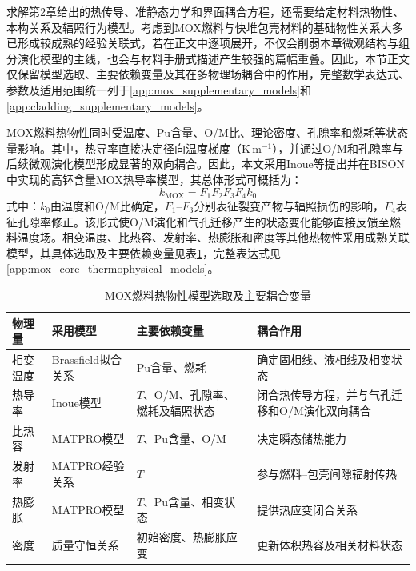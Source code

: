 求解第2章给出的热传导、准静态力学和界面耦合方程，还需要给定材料热物性、本构关系及辐照行为模型。考虑到MOX燃料与快堆包壳材料的基础物性关系大多已形成较成熟的经验关联式，若在正文中逐项展开，不仅会削弱本章微观结构与组分演化模型的主线，也会与材料手册式描述产生较强的篇幅重叠。因此，本节正文仅保留模型选取、主要依赖变量及其在多物理场耦合中的作用，完整数学表达式、参数及适用范围统一列于\ref{app:mox_supplementary_models}和\ref{app:cladding_supplementary_models}。

\label{sec:mox_thermophysical_properties}

MOX燃料热物性同时受温度、Pu含量、O/M比、理论密度、孔隙率和燃耗等状态量影响。其中，热导率直接决定径向温度梯度（$\mathrm{K\,m^{-1}}$），并通过O/M和孔隙率与后续微观演化模型形成显著的双向耦合。因此，本文采用Inoue等提出并在BISON中实现的高钚含量MOX热导率模型\cite{inoueThermalConductivityUranium2000,halesBISONTheoryManual2016}，其总体形式可概括为：
\begin{equation}
	k_{\mathrm{MOX}}
	=F_1F_2F_3F_4k_0
	\label{eq:ch3_mox_thermal_conductivity_coupling}
\end{equation}
\noindent 式中：$k_0$由温度和O/M比确定，$F_1$--$F_3$分别表征裂变产物与辐照损伤的影响，$F_4$表征孔隙率修正。该形式使O/M演化和气孔迁移产生的状态变化能够直接反馈至燃料温度场。相变温度、比热容、发射率、热膨胀和密度等其他热物性采用成熟关联模型，其具体选取及主要依赖变量见表\ref{tab:ch3_mox_thermophysical_selection}，完整表达式见\ref{app:mox_core_thermophysical_models}。

\begin{table}[htbp]
	\centering
	\caption{MOX燃料热物性模型选取及主要耦合变量}
	\label{tab:ch3_mox_thermophysical_selection}
	\begin{tabularx}{\textwidth}{@{}
			>{\centering\arraybackslash}m{2.4cm}
			>{\centering\arraybackslash}m{3.2cm}
			>{\centering\arraybackslash}X
			>{\centering\arraybackslash}X
			@{}}
		\toprule
		物理量 & 采用模型 & 主要依赖变量 & 耦合作用 \\
		\midrule
		相变温度 & Brassfield拟合关系 & Pu含量、燃耗 & 确定固相线、液相线及相变状态 \\
		热导率 & Inoue模型\cite{inoueThermalConductivityUranium2000,halesBISONTheoryManual2016} & $T$、O/M、孔隙率、燃耗及辐照状态 & 闭合热传导方程，并与气孔迁移和O/M演化双向耦合 \\
		比热容 & MATPRO模型\cite{hagrmanSCDAPRELAP5MOD1995} & $T$、Pu含量、O/M & 决定瞬态储热能力 \\
		发射率 & MATPRO经验关系 & $T$ & 参与燃料--包壳间隙辐射传热 \\
		热膨胀 & MATPRO模型 & $T$、Pu含量、相变状态 & 提供热应变闭合关系 \\
		密度 & 质量守恒关系 & 初始密度、热膨胀应变 & 更新体积热容及相关材料状态 \\
		\bottomrule
	\end{tabularx}
\end{table}

